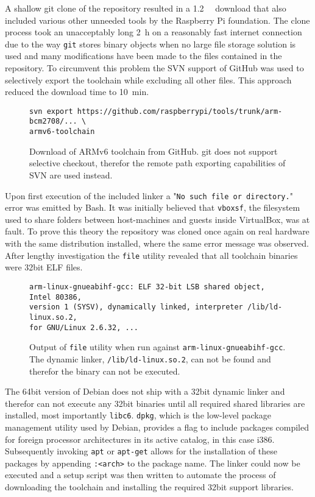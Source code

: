 A shallow git clone of the repository resulted in a \SI{1.2}{\giga\byte} download that also included various other unneeded tools by the Raspberry Pi foundation. The clone process took an unacceptably long \SI{2}{\hour} on a reasonably fast internet connection due to the way \texttt{git} stores binary objects when no large file storage solution is used and many modifications have been made to the files contained in the repository. To circumvent this problem the SVN support of GitHub was used to selectively export the toolchain while excluding all other files. This approach reduced the download time to \SI{10}{\minute}.

\begin{figure}[H]
\begin{verbatim}
svn export https://github.com/raspberrypi/tools/trunk/arm-bcm2708/... \
armv6-toolchain
\end{verbatim}
\caption{Download of ARMv6 toolchain from GitHub. git does not support selective checkout, therefor the remote path exporting capabilities of SVN are used instead.}
\end{figure}

Upon first execution of the included linker a "\texttt{No such file or directory.}" error was emitted by Bash. It was initially believed that \texttt{vboxsf}, the filesystem used to share folders between host-machines and guests inside VirtualBox, was at fault. To prove this theory the repository was cloned once again on real hardware with the same distribution installed, where the same error message was observed. After lengthy investigation the \texttt{file} utility revealed that all toolchain binaries were 32bit ELF files.

\begin{figure}[H]
\begin{verbatim}
arm-linux-gnueabihf-gcc: ELF 32-bit LSB shared object, Intel 80386, 
version 1 (SYSV), dynamically linked, interpreter /lib/ld-linux.so.2, 
for GNU/Linux 2.6.32, ...
\end{verbatim}
\caption{Output of \texttt{file} utility when run against \texttt{arm-linux-gnueabihf-gcc}. The dynamic linker, \texttt{/lib/ld-linux.so.2}, can not be found and therefor the binary can not be executed.}
\end{figure}

The 64bit version of Debian does not ship with a 32bit dynamic linker and therefor can not execute any 32bit binaries until all required shared libraries are installed, most importantly \texttt{libc6}. \texttt{dpkg}, which is the low-level package management utility used by Debian, provides a flag to include packages compiled for foreign processor architectures in its active catalog, in this case i386. Subsequently invoking \texttt{apt} or \texttt{apt-get} allows for the installation of these packages by appending \texttt{:<arch>} to the package name. The linker could now be executed and a setup script was then written to automate the process of downloading the toolchain and installing the required 32bit support libraries.

